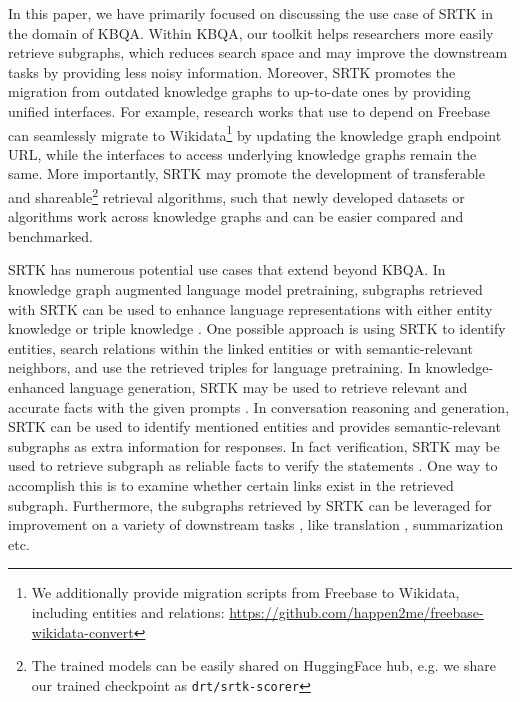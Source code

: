 \documentclass[runningheads]{llncs}
\begin{document}
In this paper, we have primarily focused on discussing the use case of SRTK in the domain of KBQA. Within KBQA, our toolkit helps researchers more easily retrieve subgraphs, which reduces search space and may improve the downstream tasks by providing less noisy information. Moreover, SRTK promotes the migration from outdated knowledge graphs to up-to-date ones by providing unified interfaces. For example, research works that use to depend on Freebase can seamlessly migrate to Wikidata\footnote{We additionally provide migration scripts from Freebase to Wikidata, including entities and relations: \url{https://github.com/happen2me/freebase-wikidata-convert}} by updating the knowledge graph endpoint URL, while the interfaces to access underlying knowledge graphs remain the same.  More importantly, SRTK may promote the development of transferable and shareable\footnote{The trained models can be easily shared on HuggingFace hub, e.g. we share our trained checkpoint as \texttt{drt/srtk-scorer}} retrieval algorithms, such that newly developed datasets or algorithms work across knowledge graphs and can be easier compared and benchmarked.

SRTK has numerous potential use cases that extend beyond KBQA. In knowledge graph augmented language model pretraining, subgraphs retrieved with SRTK can be used to enhance language representations with either entity knowledge \cite{zhang2019ernie,yamada2020luke,xiong2019encyclopedia,peters2019knowbert,fevry2020eae} or triple knowledge \cite{sun2020colake,wang2021kepler,qin2021erica}. One possible approach is using SRTK to identify entities, search relations within the linked entities or with semantic-relevant neighbors, and use the retrieved triples for language pretraining. In knowledge-enhanced language generation, SRTK may be used to retrieve relevant and accurate facts with the given prompts \cite{koncel2019textgenfromkg,ji2020languagegen,liu2020kbert,zhou2019improving}. In conversation reasoning and generation, SRTK can be used to identify mentioned entities and provides semantic-relevant subgraphs as extra information for responses\cite{zhang2020grounded,moon2019opendialkg,tuan2019dykgchat}. In fact verification, SRTK may be used to retrieve subgraph as reliable facts to verify the statements \cite{cao2018faithful}. One way to accomplish this is to examine whether certain links exist in the retrieved subgraph. Furthermore, the subgraphs retrieved by SRTK can be leveraged for improvement on a variety of downstream tasks \cite{yu2022surveyketg,zhen2022survey}, like translation \cite{moussallem2019thoth}, summarization \cite{huang2020summarize} etc.
\end{document}
